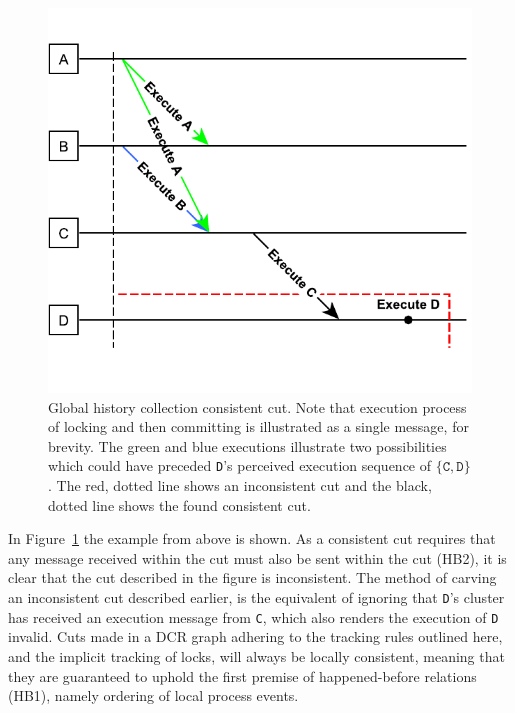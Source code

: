 \documentclass{article}
\begin{document}
	\begin{figure}[ht!]
		\center
		\includegraphics[scale=0.6]{figures/dcr-graphs/global-history-collection-consistent-cut.pdf}
		\caption{Global history collection consistent cut. Note that execution process of locking and then committing is illustrated as a single message, for brevity. The green and blue executions illustrate two possibilities which could have preceded \texttt{D}'s perceived execution sequence of $\{\texttt{C}, \texttt{D}\}$. The red, dotted line shows an inconsistent cut and the black, dotted line shows the found consistent cut.}
		\label{fig:global-history-collection-consistent-cut}
	\end{figure}
    \FloatBarrier

	In Figure~\ref{fig:global-history-collection-consistent-cut} the example from above is shown.
	As a consistent cut requires that any message received within the cut must also be sent within the cut (HB2), it is clear that the cut described in the figure is inconsistent.
	The method of carving an inconsistent cut described earlier, is the equivalent of ignoring that \texttt{D}'s cluster has received an execution message from \texttt{C}, which also renders the execution of \texttt{D} invalid.
	Cuts made in a DCR graph adhering to the tracking rules outlined here, and the implicit tracking of locks, will always be locally consistent, meaning that they are guaranteed to uphold the first premise of happened-before relations (HB1), namely ordering of local process events.
\end{document}
